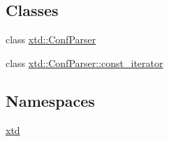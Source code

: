 \subsection*{Classes}
\begin{DoxyCompactItemize}
\item 
class \hyperlink{classxtd_1_1ConfParser}{xtd\+::\+Conf\+Parser}
\item 
class \hyperlink{classxtd_1_1ConfParser_1_1const__iterator}{xtd\+::\+Conf\+Parser\+::const\+\_\+iterator}
\end{DoxyCompactItemize}
\subsection*{Namespaces}
\begin{DoxyCompactItemize}
\item 
 \hyperlink{namespacextd}{xtd}
\end{DoxyCompactItemize}

